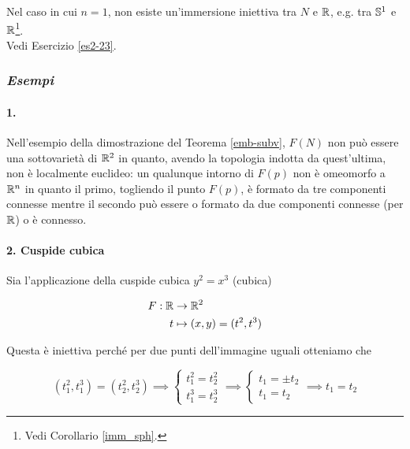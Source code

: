 Nel caso in cui $ n=1 $, non esiste un'immersione iniettiva tra $ N $ e $ \R $, e.g. tra $ \S^{1} $ e $ \R $\footnote{%
	Vedi Corollario \ref{imm_sph}.%
}.\\
Vedi Esercizio \ref{es2-23}.

\subsubsection{\textit{Esempi}}

\paragraph{1.}

Nell'esempio della dimostrazione del Teorema \ref{emb-subv}, $ F(N) $ non può essere una sottovarietà di $ \R^{2} $ in quanto, avendo la topologia indotta da quest'ultima, non è localmente euclideo: un qualunque intorno di $ F(p) $ non è omeomorfo a $ \R^{n} $ in quanto il primo, togliendo il punto $ F(p) $, è formato da tre componenti connesse mentre il secondo può essere o formato da due componenti connesse (per $ \R $) o è connesso.

\paragraph{2. Cuspide cubica}

Sia l'applicazione della cuspide cubica $ y^{2} = x^{3} $ (cubica)

\begin{align}
	\begin{split}
		F : \R &\to \R^{2}\\
		t &\mapsto (x,y) = (t^{2},t^{3})
	\end{split}
\end{align}

Questa è iniettiva perché per due punti dell'immagine uguali otteniamo che

\begin{equation}
	(t_{1}^{2},t_{1}^{3}) = (t_{2}^{2},t_{2}^{3})%
	\implies%
	\begin{cases}
		t_{1}^{2} = t_{2}^{2}\\
		t_{1}^{3} = t_{2}^{3}
	\end{cases}%
	\implies%
	\begin{cases}
		t_{1} = \pm t_{2}\\
		t_{1} = t_{2}
	\end{cases}%
	\implies%
	t_{1} = t_{2}
\end{equation}

